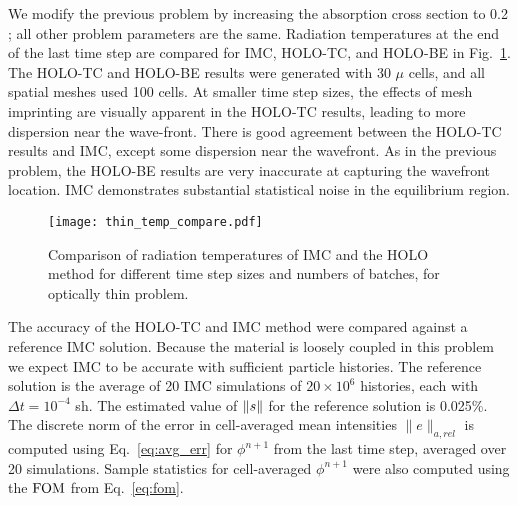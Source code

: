 We modify the previous problem by increasing the absorption cross section to 0.2
\invcm; all other problem parameters are the same.  Radiation temperatures at the end of
the last time step are compared for IMC, HOLO-TC, and HOLO-BE in
Fig.~\ref{fig:thin_temp_compare}.  The HOLO-TC and HOLO-BE results were generated with 30
$\mu$ cells, and all spatial meshes used 100 cells.  At smaller time step sizes, the
effects of mesh imprinting are visually apparent in the HOLO-TC results, leading to more
dispersion near the wave-front.  There is good agreement between
the HOLO-TC results and IMC, except some dispersion near the wavefront.
As in the previous problem, the HOLO-BE results are very
inaccurate at capturing the wavefront location. 
IMC demonstrates substantial statistical noise in the equilibrium region.

\begin{figure}[H]
  \centering
    \texttt{[image: thin\_temp\_compare.pdf]}
    \caption{\label{fig:thin_temp_compare} Comparison of radiation temperatures of IMC and
    the HOLO method for different time step sizes and numbers of batches, for optically
thin problem. }
\end{figure}

The accuracy of the HOLO-TC and IMC method were compared against a reference IMC solution.
Because the material is loosely coupled in this problem we expect IMC to be accurate with sufficient particle
histories.  The
reference solution is the average of 20 IMC simulations of $20\times10^6$
histories, each with $\Delta t =10^{-4}$ sh.  The estimated value of $\ss$ for the
reference solution is 0.025\%.  The discrete norm of the error in cell-averaged mean
intensities $\|e\|_{a,rel}$ is computed using Eq.~\eqref{eq:avg_err} for $\phi^{n+1}$ from the last time
step, averaged over 20 simulations.  Sample statistics for cell-averaged $\phi^{n+1}$ were also computed using the $\FOM$
from Eq.~\eqref{eq:fom}.

